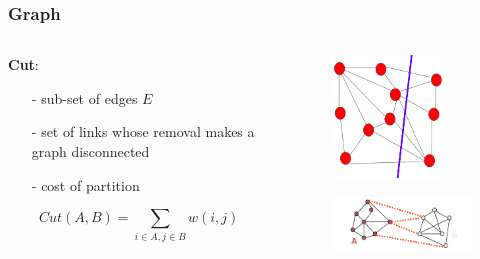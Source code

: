 \documentclass[notheorems,mathserif,table,compress]{beamer}  %
\begin{document}
\begin{frame}
   \frametitle{Graph}
   \begin{columns}
     \begin{column}[c]{0.4\textwidth}
	\textbf{\Large Cut}:
	\begin{itemize}
	\item[-] {\color{blue} sub-set} of edges $E$
	\item[-] set of links whose removal makes a graph {\color{blue} disconnected}
	\item[-] {\color{blue} cost} of partition\newline
	\end{itemize}
\begin{displaymath}
Cut(A,B)= \sum_{i\in A, j\in B} w(i,j)
\end{displaymath} %
    \end{column}

    \begin{column}[c]{0.6\textwidth}
    \centering
    \begin{figure}[!ht]
    \centering
    \includegraphics[width=1.2in]{graph3.png}
    \end{figure}
    \begin{figure}[!ht]
    \centering
    \includegraphics[width=2.4in]{graph_based.png}
    \end{figure}
    \end{column}
    \end{columns}
\end{frame}
\end{document}
